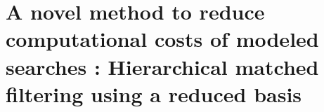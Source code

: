 \chapter{A novel method to reduce computational costs of modeled searches : Hierarchical matched filtering using a reduced basis}